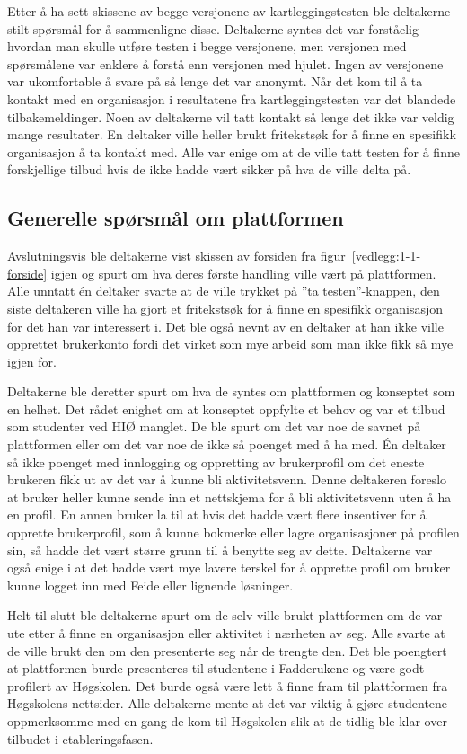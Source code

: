 Etter å ha sett skissene av begge versjonene av kartleggingstesten ble deltakerne stilt spørsmål for å sammenligne disse. Deltakerne syntes det var forståelig hvordan man skulle utføre testen i begge versjonene, men versjonen med spørsmålene var enklere å forstå enn versjonen med hjulet. Ingen av versjonene var ukomfortable å svare på så lenge det var anonymt. Når det kom til å ta kontakt med en organisasjon i resultatene fra kartleggingstesten var det blandede tilbakemeldinger. Noen av deltakerne vil tatt kontakt så lenge det ikke var veldig mange resultater. En deltaker ville heller brukt fritekstsøk for å finne en spesifikk organisasjon å ta kontakt med. Alle var enige om at de ville tatt testen for å finne forskjellige tilbud hvis de ikke hadde vært sikker på hva de ville delta på.

\subsection{Generelle spørsmål om plattformen}

Avslutningsvis ble deltakerne vist skissen av forsiden fra figur~\ref{vedlegg:1-1-forside} igjen og spurt om hva deres første handling ville vært på plattformen. Alle unntatt én deltaker svarte at de ville trykket på ''ta testen''-knappen, den siste deltakeren ville ha gjort et fritekstsøk for å finne en spesifikk organisasjon for det han var interessert i. Det ble også nevnt av en deltaker at han ikke ville opprettet brukerkonto fordi det virket som mye arbeid som man ikke fikk så mye igjen for.

Deltakerne ble deretter spurt om hva de syntes om plattformen og konseptet som en helhet. Det rådet enighet om at konseptet oppfylte et behov og var et tilbud som studenter ved HIØ manglet. De ble spurt om det var noe de savnet på plattformen eller om det var noe de ikke så poenget med å ha med. Én deltaker så ikke poenget med innlogging og oppretting av brukerprofil om det eneste brukeren fikk ut av det var å kunne bli aktivitetsvenn. Denne deltakeren foreslo at bruker heller kunne sende inn et nettskjema for å bli aktivitetsvenn uten å ha en profil. En annen bruker la til at hvis det hadde vært flere insentiver for å opprette brukerprofil, som å kunne bokmerke eller lagre organisasjoner på profilen sin, så hadde det vært større grunn til å benytte seg av dette. Deltakerne var også enige i at det hadde vært mye lavere terskel for å opprette profil om bruker kunne logget inn med Feide eller lignende løsninger.

Helt til slutt ble deltakerne spurt om de selv ville brukt plattformen om de var ute etter å finne en organisasjon eller aktivitet i nærheten av seg. Alle svarte at de ville brukt den om den presenterte seg når de trengte den. Det ble poengtert at plattformen burde presenteres til studentene i Fadderukene og være godt profilert av Høgskolen. Det burde også være lett å finne fram til plattformen fra Høgskolens nettsider. Alle deltakerne mente at det var viktig å gjøre studentene oppmerksomme med en gang de kom til Høgskolen slik at de tidlig ble klar over tilbudet i etableringsfasen.

